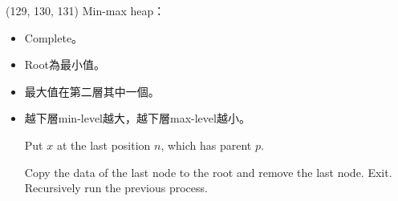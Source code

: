\item \begin{theorem}{(129, 130, 131)} Min-max heap： \label{min-maxheap}\begin{itemize}
        \item Complete。
        \item Root為最小值。
        \item 最大值在第二層其中一個。
        \item 越下層min-level越大，越下層max-level越小。
        \begin{algorithm}[H]
            \begin{algorithmic}[1]
                    \State Put $x$ at the last position $n$, which has parent $p$.
                            \State {}
                            \State {}
                        \Else
                            \State {}
                        \EndIf
                    \Else {}
                            \State {}
                            \State {}
                        \Else
                            \State {}
                        \EndIf
                    \EndIf
                \EndFunction
            \end{algorithmic}
        \end{algorithm} 
        \begin{algorithm}[H]
            \begin{algorithmic}[1]
                    \State Copy the data of the last node to the root and remove the last node.
                        \State Exit.
                            \State {}
                        \EndIf
                            \State {}
                                \State {}
                                \State Recursively run the previous process.
                            \EndIf
                        \EndIf
                    \EndIf
                \EndFunction
            \end{algorithmic}
        \end{algorithm}
    \end{itemize}
\end{theorem}

